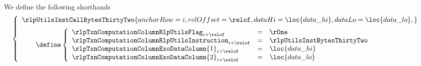 We define the following shorthands
\[
	\left\{ \begin{array}{l}
		\rlpUtilsInstCallBytesThirtyTwo {
			anchorRow = i              ,
			relOffset = \relof         ,
			dataHi    = \loc{data\_hi} ,
			dataLo    = \loc{data\_lo} ,
			}
			\vspace{2mm}
			\\
			\qquad \define
			\left\{ \begin{array}{lcl}
				\rlpTxnComputationColumnRlpUtilsFlag   _{i + \relof} & = & \rOne                       \\
				\rlpTxnComputationColumnRlpUtilsInstruction           _{i + \relof} & = & \rlpUtilsInstBytesThirtyTwo \\
				\rlpTxnComputationColumnExoDataColumn{1} _{i + \relof} & = & \loc{data\_hi}              \\
				\rlpTxnComputationColumnExoDataColumn{2} _{i + \relof} & = & \loc{data\_lo}              \\
			\end{array} \right.
	\end{array} \right.
\]
